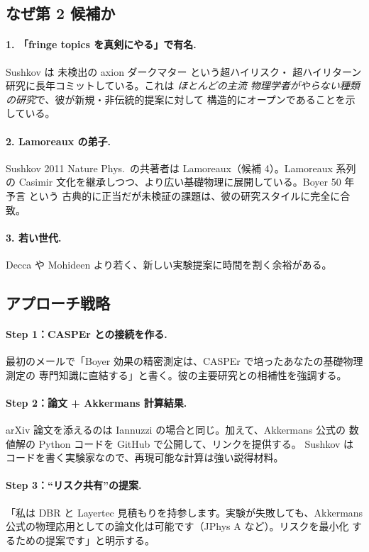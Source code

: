 \documentclass[11pt,a4paper]{article}
\def\textbf#1{#1}%
\begin{document}
\subsection{なぜ第 2 候補か}

\paragraph{1. 「fringe topics を真剣にやる」で有名.}
Sushkov は \textbf{未検出の axion ダークマター} という超ハイリスク・
超ハイリターン研究に長年コミットしている。これは \emph{ほとんどの主流
物理学者がやらない種類の研究}で、彼が新規・非伝統的提案に対して
\textbf{構造的にオープン}であることを示している。

\paragraph{2. Lamoreaux の弟子.}
Sushkov 2011 Nature Phys.\ の共著者は Lamoreaux（候補 4）。Lamoreaux 系列の
Casimir 文化を継承しつつ、より広い基礎物理に展開している。Boyer 50 年予言
という \textbf{古典的に正当だが未検証}の課題は、彼の研究スタイルに完全に合致。

\paragraph{3. 若い世代.}
Decca や Mohideen より若く、新しい実験提案に時間を割く余裕がある。

\subsection{アプローチ戦略}

\paragraph{Step 1：CASPEr との接続を作る.}
最初のメールで「Boyer 効果の精密測定は、CASPEr で培ったあなたの基礎物理測定の
専門知識に直結する」と書く。彼の主要研究との相補性を強調する。

\paragraph{Step 2：論文 + Akkermans 計算結果.}
arXiv 論文を添えるのは Iannuzzi の場合と同じ。加えて、Akkermans 公式の
数値解の Python コードを GitHub で公開して、リンクを提供する。
Sushkov は \textbf{コードを書く実験家}なので、再現可能な計算は強い説得材料。

\paragraph{Step 3：``リスク共有''の提案.}
「私は DBR と Layertec 見積もりを持参します。実験が失敗しても、Akkermans
公式の物理応用としての論文化は可能です（JPhys A など）。リスクを最小化
するための提案です」と明示する。
\end{document}
